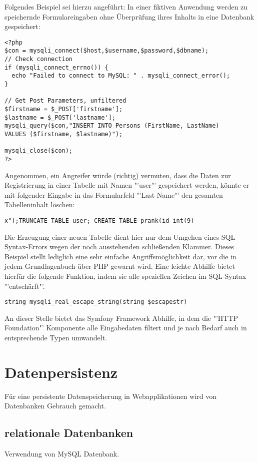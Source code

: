 \documentclass[12pt]{report}
\begin{document}
Folgendes Beispiel sei hierzu angeführt: 
In einer fiktiven Anwendung werden zu speichernde Formulareingaben ohne Überprüfung ihres Inhalts in eine Datenbank gespeichert:

\begin{lstlisting}
<?php
$con = mysqli_connect($host,$username,$password,$dbname);
// Check connection
if (mysqli_connect_errno()) {
  echo "Failed to connect to MySQL: " . mysqli_connect_error();
}

// Get Post Parameters, unfiltered
$firstname = $_POST['firstname'];
$lastname = $_POST['lastname'];
mysqli_query($con,"INSERT INTO Persons (FirstName, LastName)
VALUES ($firstname, $lastname)");

mysqli_close($con);
?>
\end{lstlisting}

Angenommen, ein Angreifer würde (richtig) vermuten, dass die Daten zur Registrierung in einer Tabelle mit Namen "'user"' gespeichert werden, könnte er mit folgender Eingabe in das Formularfeld "'Last Name"' den gesamten Tabelleninhalt löschen:
\begin{lstlisting}
x");TRUNCATE TABLE user; CREATE TABLE prank(id int(9)
\end{lstlisting}
Die Erzeugung einer neuen Tabelle dient hier nur dem Umgehen eines SQL Syntax-Errors wegen der noch ausstehenden schließenden Klammer.
Dieses Beispiel stellt lediglich eine sehr einfache Angriffsmöglichkeit dar, vor die in jedem Grundlagenbuch über PHP gewarnt wird. Eine leichte Abhilfe bietet hierfür die folgende Funktion, indem sie alle speziellen Zeichen im SQL-Syntax "'entschärft"'.
\begin{lstlisting}
string mysqli_real_escape_string(string $escapestr)
\end{lstlisting}

An dieser Stelle bietet das Symfony Framework Abhilfe, in dem die "'HTTP Foundation"' Komponente alle Eingabedaten filtert und je nach Bedarf auch in entsprechende Typen umwandelt.\cite{sf2:HTTPFoundation}

\section{Datenpersistenz}
Für eine persistente Datenspeicherung in Webapplikationen wird von Datenbanken Gebrauch gemacht.
\subsection{relationale Datenbanken}
Verwendung von MySQL Datenbank.
\end{document}
